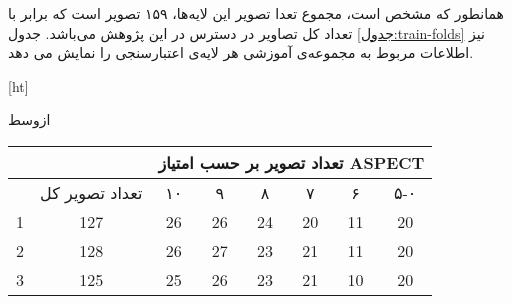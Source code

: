 
همانطور که مشخص است، مجموع تعدا تصویر این لایه‌ها، ۱۵۹ تصویر است که برابر با تعداد کل تصاویر در دسترس در این پژوهش می‌باشد.
جدول \ref{جدول:train-folds} نیز
اطلاعات مربوط به مجموعه‌ی آموزشی هر لایه‌ی اعتبارسنجی را نمایش می دهد.

[ht]

\vspace{1.5em}

‌ازوسط

\begin{tabular}{cc|cccccc|}
    \cline{3-8}
                                                               &                                        & \multicolumn{6}{c|}{\cellcolor[HTML]{EFEFEF}تعداد تصویر بر حسب امتیاز ASPECT}                                                                                                                                                                             \\ \hline
    \rowcolor[HTML]{EFEFEF} 
    \multicolumn{1}{|c|}{\cellcolor[HTML]{EFEFEF}شماره‌ی لایه} & \cellcolor[HTML]{EFEFEF}تعداد تصویر کل & \multicolumn{1}{c|}{\cellcolor[HTML]{EFEFEF}۱۰} & \multicolumn{1}{c|}{\cellcolor[HTML]{EFEFEF}۹} & \multicolumn{1}{c|}{\cellcolor[HTML]{EFEFEF}۸} & \multicolumn{1}{c|}{\cellcolor[HTML]{EFEFEF}۷} & \multicolumn{1}{c|}{\cellcolor[HTML]{EFEFEF}۶} & ۵-۰ \\ \hline
    \multicolumn{1}{|c|}{1}                                    & 127                                    & \multicolumn{1}{c|}{26}                         & \multicolumn{1}{c|}{26}                        & \multicolumn{1}{c|}{24}                        & \multicolumn{1}{c|}{20}                        & \multicolumn{1}{c|}{11}                        & 20  \\ \hline
    \multicolumn{1}{|c|}{2}                                    & 128                                    & \multicolumn{1}{c|}{26}                         & \multicolumn{1}{c|}{27}                        & \multicolumn{1}{c|}{23}                        & \multicolumn{1}{c|}{21}                        & \multicolumn{1}{c|}{11}                        & 20  \\ \hline
    \multicolumn{1}{|c|}{3}                                    & 125                                    & \multicolumn{1}{c|}{25}                         & \multicolumn{1}{c|}{26}                        & \multicolumn{1}{c|}{23}                        & \multicolumn{1}{c|}{21}                        & \multicolumn{1}{c|}{10}                        & 20  \\ \hline

\end{tabular}
